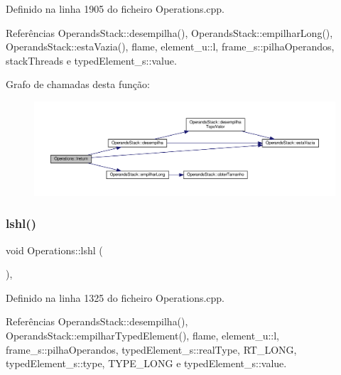 Definido na linha 1905 do ficheiro Operations.\+cpp.



Referências Operands\+Stack\+::desempilha(), Operands\+Stack\+::empilhar\+Long(), Operands\+Stack\+::esta\+Vazia(), flame, element\+\_\+u\+::l, frame\+\_\+s\+::pilha\+Operandos, stack\+Threads e typed\+Element\+\_\+s\+::value.

Grafo de chamadas desta função\+:
\nopagebreak
\begin{figure}[H]
\begin{center}
\leavevmode
\includegraphics[width=350pt]{classOperations_adbc4db2dbfcae7185bc9b7a005e988ea_cgraph}
\end{center}
\end{figure}
\mbox{\label{classOperations_a9d2b2a5ea74f26e6a5005ec9e99b24d9}} 
\subsubsection{\texorpdfstring{lshl()}{lshl()}}
{\footnotesize\ttfamily void Operations\+::lshl (\begin{DoxyParamCaption}{ }\end{DoxyParamCaption})\hspace{0.3cm}{\ttfamily [static]}, {\ttfamily [private]}}



Definido na linha 1325 do ficheiro Operations.\+cpp.



Referências Operands\+Stack\+::desempilha(), Operands\+Stack\+::empilhar\+Typed\+Element(), flame, element\+\_\+u\+::l, frame\+\_\+s\+::pilha\+Operandos, typed\+Element\+\_\+s\+::real\+Type, R\+T\+\_\+\+L\+O\+NG, typed\+Element\+\_\+s\+::type, T\+Y\+P\+E\+\_\+\+L\+O\+NG e typed\+Element\+\_\+s\+::value.

